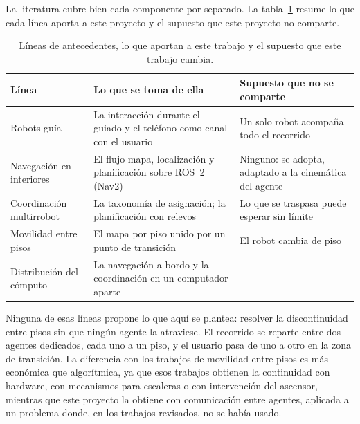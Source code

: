 La literatura cubre bien cada componente por separado. La
tabla~\ref{tab:antecedentes} resume lo que cada línea aporta a este proyecto y el supuesto que
este proyecto no comparte.

\begin{table}[H]
  \centering\footnotesize{}
  \caption{Líneas de antecedentes, lo que aportan a este trabajo y el supuesto
    que este trabajo cambia.}
  \label{tab:antecedentes}
  \begin{tabular}{@{}>{\raggedright\arraybackslash}p{}>{\raggedright\arraybackslash}p{}>{\raggedright\arraybackslash}p{}@{}}
    \toprule
    \textbf{Línea} & \textbf{Lo que se toma de ella} & \textbf{Supuesto que no se comparte} \\ \midrule
    Robots guía & La interacción durante el guiado y el teléfono como canal con el usuario & Un solo robot acompaña todo el recorrido \\ \addlinespace
    Navegación en interiores & El flujo mapa, localización y planificación sobre ROS~2 (Nav2) & Ninguno: se adopta, adaptado a la cinemática del agente \\ \addlinespace
    Coordinación multirrobot & La taxonomía de asignación; la planificación con relevos & Lo que se traspasa puede esperar sin límite \\ \addlinespace
    Movilidad entre pisos & El mapa por piso unido por un punto de transición & El robot cambia de piso \\ \addlinespace
    Distribución del cómputo & La navegación a bordo y la coordinación en un computador aparte & --- \\ \bottomrule
  \end{tabular}
\end{table}

Ninguna de esas líneas propone lo que aquí se plantea: resolver la discontinuidad entre pisos
sin que ningún agente la atraviese. El recorrido se reparte entre dos agentes dedicados, cada
uno a un piso, y el usuario pasa de uno a otro en la zona de transición. La diferencia con los
trabajos de movilidad entre pisos es más económica que algorítmica, ya que esos trabajos obtienen
la continuidad con hardware, con mecanismos para escaleras o con intervención del ascensor,
mientras que este proyecto la obtiene con comunicación entre agentes, aplicada a un problema
donde, en los trabajos revisados, no se había usado.

